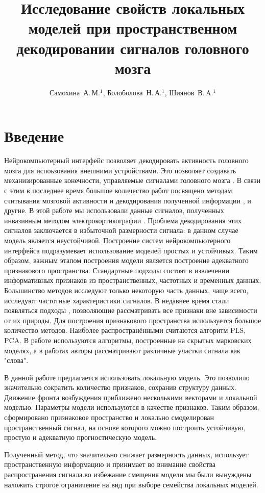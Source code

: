 \documentclass[12pt,twoside]{article}
\title
    [Исследование свойств локальных моделей при пространственном декодировании сигналов головного мозга] 
    {Исследование свойств локальных моделей при пространственном декодировании сигналов головного мозга}
\author
    [Самохина~А.\,М.] %
    {Самохина~А.\,М.$^1$, Болоболова~Н.\,А.$^1$, Шиянов~В.\,A.$^1$} %
\begin{document}
\maketitle
\bigskip
\bigskip
\bigskip
\bigskip
\maketitleSecondary

\section{Введение}
Нейрокомпьютерный интерфейс позволяет декодировать активность головного мозга для испоьзования внешними устройствами. Это позволяет создавать механизированные конечности, управляемые сигналами головного мозга \cite{Donoghue2008}. В связи с этим в последнее время большое количество работ посвящено методам считывания мозговой активности и декодирования полученной информации \cite{Hu2018}\cite{Song2017}\cite{Loza2017}\cite{Eliseyev2016}\cite{Gaglianese2016}\cite{Bundy2016}\cite{Morishita2014}, и другие. 
В этой работе мы использовали данные сигналов, полученных инвазивным методом электрокортикографии \cite{Sirven2014}. Проблема декодирования этих сигналов заключается в избыточной размерности сигнала: в данном случае модель является неустойчивой. Построение систем нейрокомпьютерного интерфейса подразумевает использование моделей простых и устойчивых. Таким образом, важным этапом построения модели является построение адекватного признакового пространства. 
Стандартные подходы состоят в извлечении информативных признаков из пространственных, частотных и временных данных\cite{Morishita2014}\cite{Alexander2013}. Большинство методов исследуют только некоторую часть данных, чаще всего, исследуют частотные характеристики сигналов\cite{Chin2007}. В недавнее время стали появляться подходы \cite{Eliseyev2016}\cite{Motrenko2018}, позволяющие рассматривать все признаки вне зависимости от их природы. Для построения признакового пространства используется большое количество методов.  Наиболее распространёнными считаются алгоритм PLS\cite{Rosipal2006}\cite{Eliseyev2016}, PCA\cite{Zhao2010}. В работе \cite{Zhao2014} используются алгоритмы, построенные на скрытых марковских моделях, а в  работах \cite{Loza2017}\cite{Song2017} авторы рассматривают различные участки сигнала как "слова". 

В данной работе предлагается использовать локальную модель. Это позволило значительно сократить количество признаков, сохранив структуру данных. Движение фронта возбуждения  приближено несколькими векторами и локальной моделью. Параметры модели используются в качестве признаков. Таким образом, сформировано признаковое пространство и локально смоделирован пространственный сигнал, на основе которого можно построить устойчивую, простую и адекватную прогностическую модель.


Полученный  метод, что значительно снижает размерность данных,  использует пространственную информацию и принимает во внимание свойства распространения сигнала.во избежание смещения модели мы были вынуждены наложить строгое ограничение на вид при выборе семейства локальных моделей.



\end{document}
